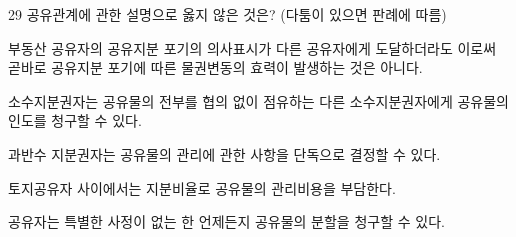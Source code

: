 \begin{question}{29}
공유관계에 관한 설명으로 옳지 않은 것은? (다툼이 있으면 판례에 따름)
\begin{choices}
  \item 부동산 공유자의 공유지분 포기의 의사표시가 다른 공유자에게 도달하더라도 이로써 곧바로 공유지분 포기에 따른 물권변동의 효력이 발생하는 것은 아니다.
  \item 소수지분권자는 공유물의 전부를 협의 없이 점유하는 다른 소수지분권자에게 공유물의 인도를 청구할 수 있다.
  \item 과반수 지분권자는 공유물의 관리에 관한 사항을 단독으로 결정할 수 있다.
  \item 토지공유자 사이에서는 지분비율로 공유물의 관리비용을 부담한다.
  \item 공유자는 특별한 사정이 없는 한 언제든지 공유물의 분할을 청구할 수 있다.
\end{choices}
\end{question}
